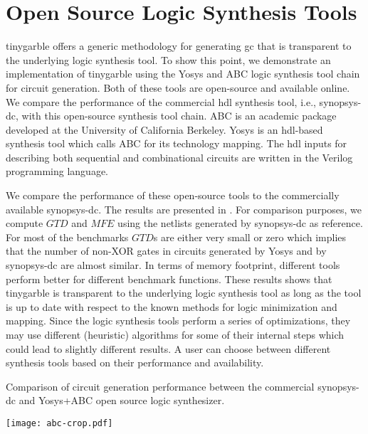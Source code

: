 \chapter{Open Source Logic Synthesis Tools}\label{chap:open-source}
\gls{tinygarble} offers a generic methodology for generating \acrshort{gc} that is transparent to the underlying logic synthesis tool.
To show this point, we demonstrate an implementation of \gls{tinygarble} using the Yosys \cite{tool:Yosys} and ABC \cite{tool:ABC} logic synthesis tool chain for circuit generation.
Both of these tools are open-source and available online.
We compare the performance of the commercial \acrshort{hdl} synthesis tool, i.e., \gls{synopsys-dc}, with this open-source synthesis tool chain.
ABC is an academic package developed at the University of California Berkeley.
Yosys is an \acrshort{hdl}-based synthesis tool which calls ABC for its technology mapping.
The \acrshort{hdl} inputs for describing both sequential and combinational circuits are written in the Verilog programming language.

We compare the performance of these open-source tools to the commercially available \gls{synopsys-dc}.
The results are presented in .
For comparison purposes, we compute $\mathit{GTD}$ and $\mathit{MFE}$ using the netlists generated by \gls{synopsys-dc} as reference.
For most of the benchmarks $\mathit{GTD}$s are either very small or zero which implies that the number of non-XOR gates in circuits generated by Yosys and by \gls{synopsys-dc} are almost similar.
In terms of memory footprint, different tools perform better for different benchmark functions.
These results shows that \gls{tinygarble} is transparent to the underlying logic synthesis tool as long as the tool is up to date with respect to the known methods for logic minimization and mapping.
Since the logic synthesis tools perform a series of optimizations, they may use different (heuristic) algorithms for some of their internal steps which could lead to slightly different results.
A user can choose between different synthesis tools based on their performance and availability.

\begin{table}
\caption{Comparison of circuit generation performance between the commercial \gls{synopsys-dc} and Yosys+ABC open source logic synthesizer.}
\label{table:abc}
\centering
\texttt{[image: abc-crop.pdf]}
\end{table}
